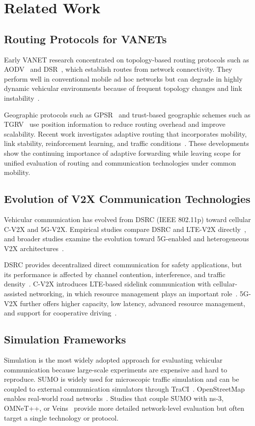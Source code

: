 \documentclass[conference]{IEEEtran}
\begin{document}
 
\section{Related Work}
\subsection{Routing Protocols for VANETs}
Early VANET research concentrated on topology-based routing protocols such as AODV~\cite{perkins1999} and DSR~\cite{johnson2007}, which establish routes from network connectivity. They perform well in conventional mobile ad hoc networks but can degrade in highly dynamic vehicular environments because of frequent topology changes and link instability~\cite{chatterjee2022,wang2025}.

Geographic protocols such as GPSR~\cite{karp2000} and trust-based geographic schemes such as TGRV~\cite{shokrollahi2023} use position information to reduce routing overhead and improve scalability. Recent work investigates adaptive routing that incorporates mobility, link stability, reinforcement learning, and traffic conditions~\cite{chatterjee2022,wang2025,yang2024,jameel2022}. These developments show the continuing importance of adaptive forwarding while leaving scope for unified evaluation of routing and communication technologies under common mobility.

\subsection{Evolution of V2X Communication Technologies}
Vehicular communication has evolved from DSRC (IEEE 802.11p) toward cellular C-V2X and 5G-V2X. Empirical studies compare DSRC and LTE-V2X directly~\cite{moradi2023}, and broader studies examine the evolution toward 5G-enabled and heterogeneous V2X architectures~\cite{souri2024,pawar2024,baccari2025}.

DSRC provides decentralized direct communication for safety applications, but its performance is affected by channel contention, interference, and traffic density~\cite{moradi2023}. C-V2X introduces LTE-based sidelink communication with cellular-assisted networking, in which resource management plays an important role~\cite{3gpp36885,hwang2023}. 5G-V2X further offers higher capacity, low latency, advanced resource management, and support for cooperative driving~\cite{pawar2024,hwang2023}.

\subsection{Simulation Frameworks}
Simulation is the most widely adopted approach for evaluating vehicular communication because large-scale experiments are expensive and hard to reproduce. SUMO is widely used for microscopic traffic simulation and can be coupled to external communication simulators through TraCI~\cite{lopez2018,wegener2008,loor2024,morales2024}. OpenStreetMap enables real-world road networks~\cite{osm}. Studies that couple SUMO with ns-3, OMNeT++, or Veins~\cite{loor2024,morales2024,sommer2011} provide more detailed network-level evaluation but often target a single technology or protocol.
\end{document}

